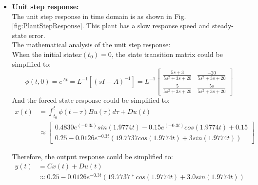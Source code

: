 \documentclass[12pt, oneside]{article}
\begin{document}
\begin{itemize}
    
    \item \textbf{Unit step response:} 
    \\The unit step response in time domain is as shown in Fig. \ref{fig:PlantStepResponse}. This plant has a slow response speed and steady-state error.
    \vspace{0.3cm}
    \\The mathematical analysis of the unit step response:
    \\When the initial state$x(t_0)=0$, the state transition matrix could be simplified to:
    \begin{equation}
        \phi(t,0)=e^{At}=L^{-1}[(sI-A)^{-1}]=L^{-1}
        \left[\begin{array}{ccc}\frac{5s+3}{5s^2+3s+20}&\frac{-20}{5s^2+3s+20}\\
        \frac{5}{5s^2+3s+20}&\frac{5s}{5s^2+3s+20}\end{array}\right]
    \end{equation}
    And the forced state response could be simplified to:
    \begin{equation}
    \begin{aligned}
        x(t)&=\int_{t_0}^t\phi(t-\tau)Bu(\tau)d\tau+Du(t)\\
        & \approx
        \left[
        \begin{array}{cc}
        0.4830e^{(-0.3t)}sin(1.9774t)-0.15e^{(-0.3t)}cos(1.9774t)+0.15  \\
             0.25-0.0126e^{-0.3t}(19.7737cos(1.9774t)+3sin(1.9774t)) 
        \end{array}
        \right]
    \end{aligned}
    \end{equation}

    Therefore, the output response could be simplified to:
    \begin{equation}
    \begin{aligned}
        y(t)&=Cx(t)+Du(t)\\
        & \approx
        0.25 - 0.0126e^{-0.3t}(19.7737*cos(1.9774t) + 3.0sin(1.9774t))
    \end{aligned}
    \end{equation}
    



\end{itemize}
\end{document}
